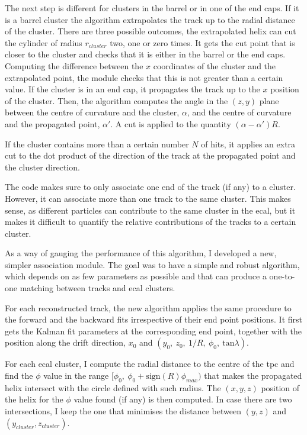 The next step is different for clusters in the barrel or in one of the end caps. If it is a barrel cluster the algorithm extrapolates the track up to the radial distance of the cluster. There are three possible outcomes, the extrapolated helix can cut the cylinder of radius $r_{cluster}$ two, one or zero times. It gets the cut point that is closer to the cluster and checks that it is either in the barrel or the end caps. Computing the difference between the $x$ coordinates of the cluster and the extrapolated point, the module checks that this is not greater than a certain value. If the cluster is in an end cap, it propagates the track up to the $x$ position of the cluster. Then, the algorithm computes the angle in the $(z,y)$ plane between the centre of curvature and the cluster, $\alpha$, and the centre of curvature and the propagated point, $\alpha'$. A cut is applied to the quantity $(\alpha-\alpha')R$.

If the cluster contains more than a certain number $N$ of hits, it applies an extra cut to the dot product of the direction of the track at the propagated point and the cluster direction.

The code makes sure to only associate one end of the track (if any) to a cluster. However, it can associate more than one track to the same cluster. This makes sense, as different particles can contribute to the same cluster in the \gls{ecal}, but it makes it difficult to quantify the relative contributions of the tracks to a certain cluster.

As a way of gauging the performance of this algorithm, I developed a new, simpler association module. The goal was to have a simple and robust algorithm, which depends on as few parameters as possible and that can produce a one-to-one matching between tracks and \gls{ecal} clusters.

For each reconstructed track, the new algorithm applies the same procedure to the forward and the backward fits irrespective of their end point positions. It first gets the Kalman fit parameters at the corresponding end point, together with the position along the drift direction, $x_{0}$ and $(y_{0}, \ z_{0}, \ 1/R, \ \phi_{0}, \ \mathrm{tan}\lambda)$.

For each \gls{ecal} cluster, I compute the radial distance to the centre of the \gls{tpc} and find the $\phi$ value in the range $[\phi_{0}, \ \phi_{0}+\mathrm{sign}(R)\phi_{max})$ that makes the propagated helix intersect with the circle defined with such radius. The $(x,y,z)$ position of the helix for the $\phi$ value found (if any) is then computed. In case there are two intersections, I keep the one that minimises the distance between $(y, z)$ and $(y_{cluster}, z_{cluster})$.

